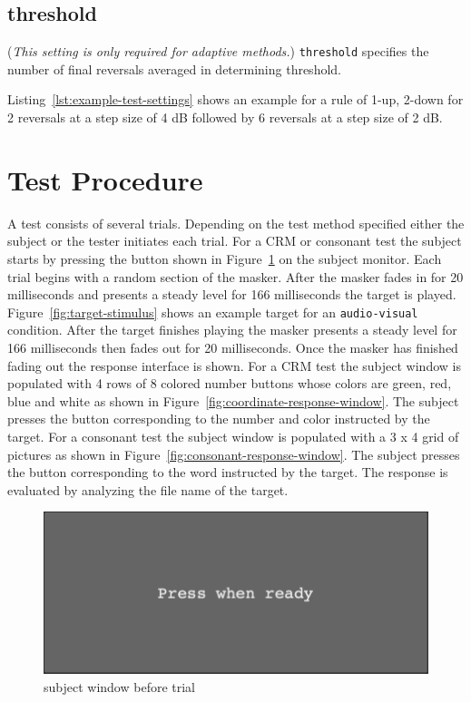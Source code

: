 \documentclass[11pt,pdftex,letterpaper]{article}
\begin{document}
\subsection{threshold}
(\textit{This setting is only required for adaptive methods.}) \texttt{threshold} specifies the number of final reversals averaged in determining threshold.

\vspace{\baselineskip}
Listing~\ref{lst:example-test-settings} shows an example for a rule of 1-up, 2-down for 2 reversals at a step size of 4 dB followed by 6 reversals at a step size of 2 dB.

\section{Test Procedure}
A test consists of several trials. Depending on the test method specified either the subject or the tester initiates each trial. For a CRM or consonant test the subject starts by pressing the button shown in Figure~\ref{fig:subject-ready-window} on the subject monitor. Each trial begins with a random section of the masker. After the masker fades in for 20 milliseconds and presents a steady level for 166 milliseconds the target is played. Figure~\ref{fig:target-stimulus} shows an example target for an \texttt{audio-visual} condition. After the target finishes playing the masker presents a steady level for 166 milliseconds then fades out for 20 milliseconds. Once the masker has finished fading out the response interface is shown. For a CRM test the subject window is populated with 4 rows of 8 colored number buttons whose colors are green, red, blue and white as shown in Figure~\ref{fig:coordinate-response-window}. The subject presses the button corresponding to the number and color instructed by the target. For a consonant test the subject window is populated with a 3 x 4 grid of pictures as shown in Figure~\ref{fig:consonant-response-window}. The subject presses the button corresponding to the word instructed by the target. The response is evaluated by analyzing the file name of the target.

\begin{figure}
\centering
\includegraphics[width = 0.9\linewidth]{subject-ready-window.png}
\caption{subject window before trial}
\label{fig:subject-ready-window}
\end{figure}
\end{document}
